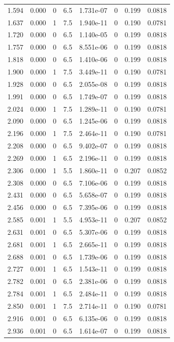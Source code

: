 \documentclass[preview]{standalone}
\begin{document}
{{\begin{tabular}{L{1.2cm}C{1.2cm} C{0.3cm}C{0.5cm} C{1.4cm}C{1.4cm} C{1.4cm}C{1.4cm}}
  1.594  &  0.000  & 0     & 6.5 &  1.731e-07  & 0  & 0.199 &  0.0818   \\ 
  1.637  &  0.000  & 1     & 7.5 &  1.940e-11  & 0  & 0.190 &  0.0781   \\ 
  1.720  &  0.000  & 0     & 6.5 &  1.140e-05  & 0  & 0.199 &  0.0818   \\ 
  1.757  &  0.000  & 0     & 6.5 &  8.551e-06  & 0  & 0.199 &  0.0818   \\ 
  1.818  &  0.000  & 0     & 6.5 &  1.410e-06  & 0  & 0.199 &  0.0818   \\ 
  1.900  &  0.000  & 1     & 7.5 &  3.449e-11  & 0  & 0.190 &  0.0781   \\ 
  1.928  &  0.000  & 0     & 6.5 &  2.055e-08  & 0  & 0.199 &  0.0818   \\ 
  1.991  &  0.000  & 0     & 6.5 &  1.749e-07  & 0  & 0.199 &  0.0818   \\ 
  2.024  &  0.000  & 1     & 7.5 &  1.289e-11  & 0  & 0.190 &  0.0781   \\ 
  2.090  &  0.000  & 0     & 6.5 &  1.245e-06  & 0  & 0.199 &  0.0818   \\ 
  2.196  &  0.000  & 1     & 7.5 &  2.464e-11  & 0  & 0.190 &  0.0781   \\ 
  2.208  &  0.000  & 0     & 6.5 &  9.402e-07  & 0  & 0.199 &  0.0818   \\ 
  2.269  &  0.000  & 1     & 6.5 &  2.196e-11  & 0  & 0.199 &  0.0818   \\ 
  2.306  &  0.000  & 1     & 5.5 &  1.860e-11  & 0  & 0.207 &  0.0852   \\ 
  2.308  &  0.000  & 0     & 6.5 &  7.106e-06  & 0  & 0.199 &  0.0818   \\ 
  2.431  &  0.000  & 0     & 6.5 &  5.658e-07  & 0  & 0.199 &  0.0818   \\ 
  2.456  &  0.000  & 0     & 6.5 &  7.395e-06  & 0  & 0.199 &  0.0818   \\ 
  2.585  &  0.001  & 1     & 5.5 &  4.953e-11  & 0  & 0.207 &  0.0852   \\ 
  2.631  &  0.001  & 0     & 6.5 &  5.307e-06  & 0  & 0.199 &  0.0818   \\ 
  2.681  &  0.001  & 1     & 6.5 &  2.665e-11  & 0  & 0.199 &  0.0818   \\ 
  2.688  &  0.001  & 0     & 6.5 &  1.739e-06  & 0  & 0.199 &  0.0818   \\ 
  2.727  &  0.001  & 1     & 6.5 &  1.543e-11  & 0  & 0.199 &  0.0818   \\ 
  2.782  &  0.001  & 0     & 6.5 &  2.381e-06  & 0  & 0.199 &  0.0818   \\ 
  2.784  &  0.001  & 1     & 6.5 &  2.484e-11  & 0  & 0.199 &  0.0818   \\ 
  2.850  &  0.001  & 1     & 7.5 &  2.714e-11  & 0  & 0.190 &  0.0781   \\ 
  2.916  &  0.001  & 0     & 6.5 &  6.135e-06  & 0  & 0.199 &  0.0818   \\ 
  2.936  &  0.001  & 0     & 6.5 &  1.614e-07  & 0  & 0.199 &  0.0818   \\ 
\hline 
\end{tabular} 

}}
\end{document}
